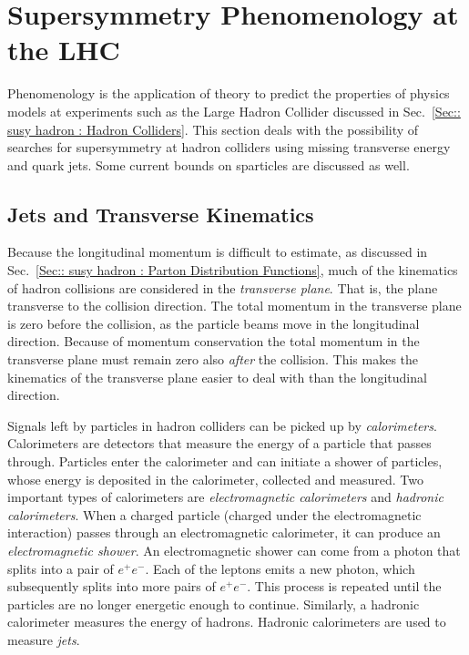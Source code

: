 \documentclass[twoside,english]{uiofysmaster}
\begin{document}
{\section{Supersymmetry Phenomenology at the LHC}

Phenomenology is the application of theory to predict the properties of physics models at experiments such as the Large Hadron Collider discussed in Sec.~\ref{Sec:: susy hadron : Hadron Colliders}. This section deals with the possibility of searches for supersymmetry at hadron colliders using missing transverse energy and quark jets. Some current bounds on sparticles are discussed as well.

\subsection{Jets and Transverse Kinematics}\label{Sec:: susy hadron : Jets and transverse kinematics}

Because the longitudinal momentum is difficult to estimate, as discussed in Sec.~\ref{Sec:: susy hadron : Parton Distribution Functions}, much of the kinematics of hadron collisions are considered in the \textit{transverse plane}. That is, the plane transverse to the collision direction. The total momentum in the transverse plane is zero before the collision, as the particle beams move in the longitudinal direction. Because of momentum conservation the total momentum in the transverse plane must remain zero also \textit{after} the collision. This makes the kinematics of the transverse plane easier to deal with than the longitudinal direction.

Signals left by particles in hadron colliders can be picked up by \textit{calorimeters}. Calorimeters are detectors that measure the energy of a particle that passes through. Particles enter the calorimeter and can initiate a shower of particles, whose energy is deposited in the calorimeter, collected and measured. Two important types of calorimeters are \textit{electromagnetic calorimeters} and \textit{hadronic calorimeters}. When a charged particle (charged under the electromagnetic interaction) passes through an electromagnetic calorimeter, it can produce an \textit{electromagnetic shower}. An electromagnetic shower can come from a photon that splits into a pair of $e^+e^-$. Each of the leptons emits a new photon, which subsequently splits into more pairs of $e^+e^-$. This process is repeated until the particles are no longer energetic enough to continue. Similarly, a hadronic calorimeter measures the energy of hadrons. Hadronic calorimeters are used to measure \textit{jets}.


}
\end{document}
